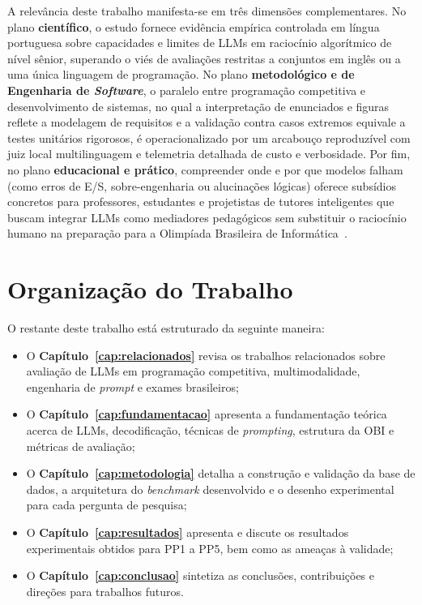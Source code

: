 A relevância deste trabalho manifesta-se em três dimensões complementares. No plano \textbf{científico}, o estudo fornece evidência empírica controlada em língua portuguesa sobre capacidades e limites de LLMs em raciocínio algorítmico de nível sênior, superando o viés de avaliações restritas a conjuntos em inglês ou a uma única linguagem de programação. No plano \textbf{metodológico e de Engenharia de \textit{Software}}, o paralelo entre programação competitiva e desenvolvimento de sistemas, no qual a interpretação de enunciados e figuras reflete a modelagem de requisitos e a validação contra casos extremos equivale a testes unitários rigorosos, é operacionalizado por um arcabouço reproduzível com juiz local multilinguagem e telemetria detalhada de custo e verbosidade. Por fim, no plano \textbf{educacional e prático}, compreender onde e por que modelos falham (como erros de E/S, sobre-engenharia ou alucinações lógicas) oferece subsídios concretos para professores, estudantes e projetistas de tutores inteligentes que buscam integrar LLMs como mediadores pedagógicos sem substituir o raciocínio humano na preparação para a Olimpíada Brasileira de Informática~\citep{priyanka2025development,peng2025enhancing}.

\section{Organização do Trabalho}\label{sec:intro-organizacao}

O restante deste trabalho está estruturado da seguinte maneira:
\begin{itemize}
    \item O \textbf{Capítulo~\ref{cap:relacionados}} revisa os trabalhos relacionados sobre avaliação de LLMs em programação competitiva, multimodalidade, engenharia de \textit{prompt} e exames brasileiros;
    \item O \textbf{Capítulo~\ref{cap:fundamentacao}} apresenta a fundamentação teórica acerca de LLMs, decodificação, técnicas de \textit{prompting}, estrutura da OBI e métricas de avaliação;
    \item O \textbf{Capítulo~\ref{cap:metodologia}} detalha a construção e validação da base de dados, a arquitetura do \textit{benchmark} desenvolvido e o desenho experimental para cada pergunta de pesquisa;
    \item O \textbf{Capítulo~\ref{cap:resultados}} apresenta e discute os resultados experimentais obtidos para PP1 a PP5, bem como as ameaças à validade;
    \item O \textbf{Capítulo~\ref{cap:conclusao}} sintetiza as conclusões, contribuições e direções para trabalhos futuros.
\end{itemize}
